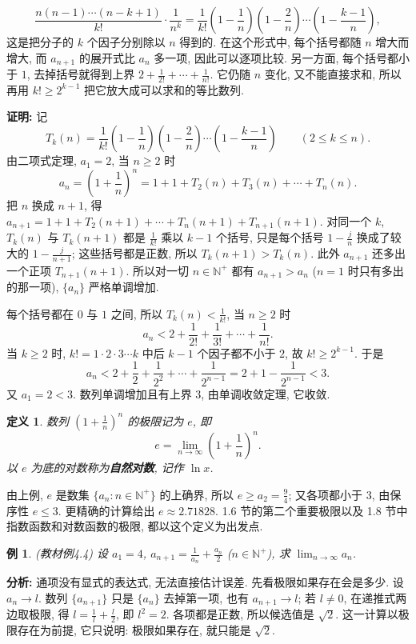 \documentclass[UTF8,openany]{ctexbook}
\theoremstyle{chinesetextbook}
\newtheorem{definition}{定义}[section]
\newtheorem{example}{例}[section]
\newenvironment{cnproof}{\par\indent\textbf{证明:} \ignorespaces}{\par}
\begin{document}
\[
\frac{n(n-1)\cdots(n-k+1)}{k!}\cdot\frac1{n^k}=\frac1{k!}\left(1-\frac1n\right)\left(1-\frac2n\right)\cdots\left(1-\frac{k-1}n\right),
\]
这是把分子的 $k$ 个因子分别除以 $n$ 得到的. 在这个形式中, 每个括号都随 $n$ 增大而增大, 而 $a_{n+1}$ 的展开式比 $a_n$ 多一项, 因此可以逐项比较. 另一方面, 每个括号都小于 $1$, 去掉括号就得到上界 $\displaystyle2+\frac1{2!}+\cdots+\frac1{n!}$. 它仍随 $n$ 变化, 又不能直接求和, 所以再用 $k!\ge2^{k-1}$ 把它放大成可以求和的等比数列.
\begin{cnproof}
记
\[
T_k(n)=\frac1{k!}\left(1-\frac1n\right)\left(1-\frac2n\right)\cdots\left(1-\frac{k-1}n\right)\qquad(2\le k\le n).
\]
由二项式定理, $a_1=2$, 当 $n\ge2$ 时
\[
a_n=\left(1+\frac1n\right)^n=1+1+T_2(n)+T_3(n)+\cdots+T_n(n).
\]
把 $n$ 换成 $n+1$, 得 $a_{n+1}=1+1+T_2(n+1)+\cdots+T_n(n+1)+T_{n+1}(n+1)$. 对同一个 $k$, $T_k(n)$ 与 $T_k(n+1)$ 都是 $\displaystyle\frac1{k!}$ 乘以 $k-1$ 个括号, 只是每个括号 $\displaystyle1-\frac jn$ 换成了较大的 $\displaystyle1-\frac j{n+1}$; 这些括号都是正数, 所以 $T_k(n+1)>T_k(n)$. 此外 $a_{n+1}$ 还多出一个正项 $T_{n+1}(n+1)$. 所以对一切 $n\in\mathbb N^+$ 都有 $a_{n+1}>a_n$ ($n=1$ 时只有多出的那一项), $\{a_n\}$ 严格单调增加.

每个括号都在 $0$ 与 $1$ 之间, 所以 $\displaystyle T_k(n)<\frac1{k!}$, 当 $n\ge2$ 时
\[
a_n<2+\frac1{2!}+\frac1{3!}+\cdots+\frac1{n!}.
\]
当 $k\ge2$ 时, $k!=1\cdot2\cdot3\cdots k$ 中后 $k-1$ 个因子都不小于 $2$, 故 $k!\ge2^{k-1}$. 于是
\[
a_n<2+\frac12+\frac1{2^2}+\cdots+\frac1{2^{n-1}}=2+1-\frac1{2^{n-1}}<3.
\]
又 $a_1=2<3$. 数列单调增加且有上界 $3$, 由单调收敛定理, 它收敛.
\end{cnproof}
\begin{definition}
数列 $\displaystyle\left(1+\frac1n\right)^n$ 的极限记为 $e$, 即
\[
e=\lim_{n\to\infty}\left(1+\frac1n\right)^n.
\]
以 $e$ 为底的对数称为\textbf{自然对数}, 记作 $\ln x$.
\end{definition}
由上例, $e$ 是数集 $\{a_n:n\in\mathbb N^+\}$ 的上确界, 所以 $\displaystyle e\ge a_2=\frac94$; 又各项都小于 $3$, 由保序性 $e\le3$. 更精确的计算给出 $e\approx2.71828$. 1.6 节的第二个重要极限以及 1.8 节中指数函数和对数函数的极限, 都以这个定义为出发点.
\begin{example}\label{ex:4-4}
\textnormal{(教材例4.4)} 设 $a_1=4$, $\displaystyle a_{n+1}=\frac1{a_n}+\frac{a_n}2$ ($n\in\mathbb N^+$), 求 $\displaystyle\lim_{n\to\infty}a_n$.
\end{example}
\par\indent\textbf{分析:} 通项没有显式的表达式, 无法直接估计误差. 先看极限如果存在会是多少. 设 $a_n\to l$. 数列 $\{a_{n+1}\}$ 只是 $\{a_n\}$ 去掉第一项, 也有 $a_{n+1}\to l$; 若 $l\ne0$, 在递推式两边取极限, 得 $\displaystyle l=\frac1l+\frac l2$, 即 $l^2=2$. 各项都是正数, 所以候选值是 $\sqrt2$. 这一计算以极限存在为前提, 它只说明: 极限如果存在, 就只能是 $\sqrt2$.
\end{document}
